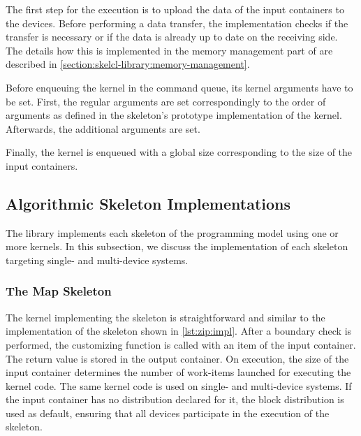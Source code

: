 The first step for the execution is to upload the data of the input containers to the \OpenCL devices.
Before performing a data transfer, the \SkelCL implementation checks if the transfer is necessary or if the data is already up to date on the receiving side.
The details how this is implemented in the memory management part of \SkelCL are described in \autoref{section:skelcl-library:memory-management}.

Before enqueuing the \OpenCL kernel in the \OpenCL command queue, its kernel arguments have to be set.
First, the regular arguments are set correspondingly to the order of arguments as defined in the skeleton's prototype implementation of the \OpenCL kernel.
Afterwards, the additional arguments are set.

Finally, the \OpenCL kernel is enqueued with a global size corresponding to the size of the input containers.










\subsection{Algorithmic Skeleton Implementations}
\label{section:skelcl-library:skeletons}
The \SkelCL library implements each skeleton of the \SkelCL programming model using one or more \OpenCL kernels.
In this subsection, we discuss the implementation of each skeleton targeting single- and multi-device systems.





\subsubsection{The Map Skeleton}
The \OpenCL kernel implementing the \map skeleton is straightforward and similar to the implementation of the \zip skeleton shown in \autoref{lst:zip:impl}.
After a boundary check is performed, the customizing function is called with an item of the input container.
The return value is stored in the output container.
On execution, the size of the input container determines the number of work-items launched for executing the kernel code.
The same kernel code is used on single- and multi-device systems.
If the input container has no distribution declared for it, the block distribution is used as default, ensuring that all devices participate in the execution of the \map skeleton.

